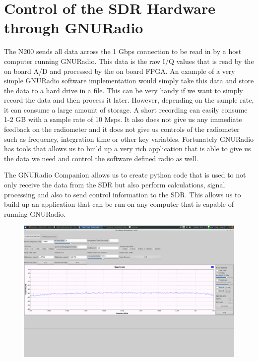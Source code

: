 \section{Control of the SDR Hardware through GNURadio}
The N200 sends all data across the 1 Gbps connection to be read in by a host computer running GNURadio.  This data is the raw I/Q values that is read by the on board A/D and processed by the on board FPGA.  An example of a very simple GNURadio software implementation would simply take this data and store the data to a hard drive in a file.  This can be very handy if we want to simply record the data and then process it later.  However, depending on the sample rate, it can consume a large amount of storage.  A short recording can easily consume 1-2 GB with a sample rate of 10 Msps.  It also does not give us any immediate feedback on the radiometer and it does not give us controls of the radiometer such as frequency, integration time or other key variables.  Fortunately GNURadio has tools that allows us to build up a very rich application that is able to give us the data we need and control the software defined radio as well.

The GNURadio Companion allows us to create python code that is used to not only receive the data from the SDR but also perform calculations, signal processing and also to send control information to the SDR.  This allows us to build up an application that can be run on any computer that is capable of running GNURadio.  

{\begin{figure}[h!tb] 
\centering
\includegraphics[width=17cm]{Images/radiometer_gui.png}
\label{radiometer_gui}
\end{figure}
}

